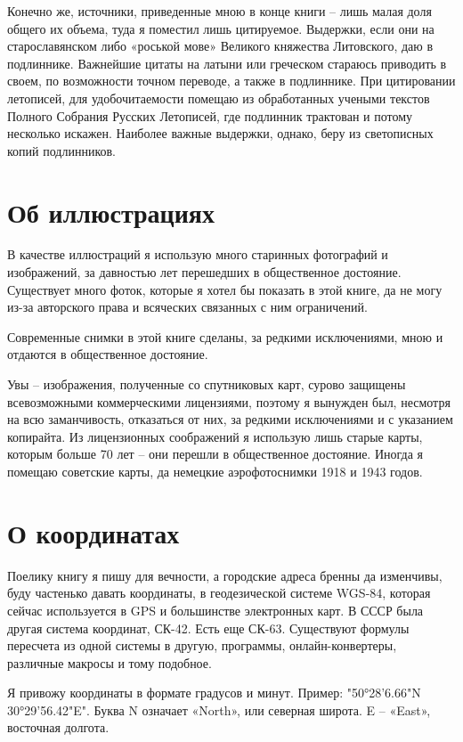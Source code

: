 Конечно же, источники, приведенные мною в конце книги – лишь малая доля общего их объема, туда я поместил лишь цитируемое. Выдержки, если они на старославянском либо «роськой мове» Великого княжества Литовского, даю в подлиннике. Важнейшие цитаты на латыни или греческом стараюсь приводить в своем, по возможности точном переводе, а также в подлиннике. При цитировании летописей, для удобочитаемости помещаю из обработанных учеными текстов Полного Собрания Русских Летописей, где подлинник трактован и потому несколько искажен. Наиболее важные выдержки, однако, беру из светописных копий подлинников.

\section*{Об иллюстрациях} 

В качестве иллюстраций я использую много старинных фотографий и изображений, за давностью лет перешедших в общественное достояние. Существует много фоток, которые я хотел бы показать в этой книге, да не могу из-за авторского права и всяческих связанных с ним ограничений.

Современные снимки в этой книге сделаны, за редкими исключениями, мною и отдаются в общественное достояние.

Увы – изображения, полученные со спутниковых карт, сурово защищены всевозможными коммерческими лицензиями, поэтому я вынужден был, несмотря на всю заманчивость, отказаться от них, за редкими исключениями и с указанием копирайта. Из лицензионных соображений я использую лишь старые карты, которым больше 70 лет – они перешли в общественное достояние. Иногда я помещаю советские карты, да немецкие аэрофотоснимки 1918 и 1943 годов.

\section*{О координатах}

Поелику книгу я пишу для вечности, а городские адреса бренны да изменчивы, буду частенько давать координаты, в геодезической системе WGS-84, которая сейчас используется в GPS и большинстве электронных карт. В СССР была другая система координат, СК-42. Есть еще СК-63. Существуют формулы пересчета из одной системы в другую, программы, онлайн-конвертеры, различные макросы и тому подобное. 

Я привожу координаты в формате градусов и минут. Пример: "50°28'6.66"N 30°29'56.42"E". Буква N означает «North», или северная широта. E – «East», восточная долгота.

